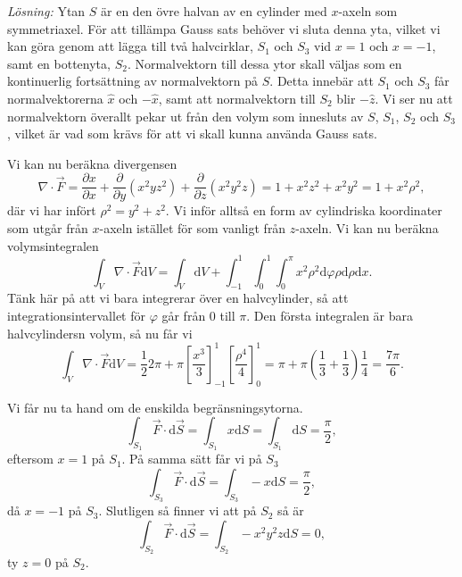 \documentclass[%
oneside,                 %
final,                   %
10pt]{article}
\begin{document}
\emph{Lösning:}  
Ytan $S$ är en den övre halvan av en cylinder med $x$-axeln som symmetriaxel.  För att tillämpa Gauss sats behöver vi sluta denna yta, vilket vi kan göra genom att lägga till  två halvcirklar, $S_1$ och $S_3$ vid $x = 1$ och $x = -1$, samt en bottenyta, $S_2$.  Normalvektorn till dessa ytor skall väljas som en kontinuerlig fortsättning av normalvektorn på $S$.  Detta innebär att $S_1$ och $S_3$ får normalvektorerna $\hat{x}$ och $-\hat{x}$, samt att normalvektorn till $S_2$ blir $-\hat{z}$.  Vi ser nu att  normalvektorn överallt pekar ut från den volym som innesluts av $S$, $S_1$, $S_2$ och $S_3$, vilket är vad som krävs för att vi skall kunna använda Gauss sats.

Vi kan nu beräkna divergensen
\begin{equation}
  \nabla \cdot \vec{F} = \frac{\partial x}{\partial x} + 
\frac{\partial}{\partial y}\left(x^2yz^2\right) + \frac{\partial}{\partial z}
\left(x^2y^2z\right) = 1 + x^2z^2 + x^2 y^2 = 1 + x^2\rho^2,
\end{equation}
där vi har infört $\rho^2 = y^2 + z^2$.  Vi inför alltså en form av cylindriska koordinater som utgår från $x$-axeln istället för som vanligt från $z$-axeln.  Vi kan nu beräkna volymsintegralen
\begin{equation}
  \int_V \nabla \cdot \vec{F} \mbox{d}V = \int_V \mbox{d}V + 
\int_{-1}^1\int_0^1\int_0^\pi x^2 \rho^2 \mbox{d}\varphi \rho \mbox{d}\rho
\mbox{d}x.
\end{equation}
Tänk här på att vi bara integrerar över en halvcylinder, så att integrationsintervallet för $\varphi$ går från 0 till $\pi$.  Den första integralen är bara halvcylindersn volym, så nu får vi
\begin{equation}
  \int_V \nabla \cdot \vec{F} \mbox{d}V = \frac{1}{2} 2 \pi + \pi  \left[\frac{x^3}{3}\right]_{-1}^1 \left[\frac{\rho^4}{4}\right]_0^1 =
\pi + \pi\left(\frac{1}{3} + \frac{1}{3}\right) \frac{1}{4} = \frac{7\pi}{6}.
\end{equation}

Vi får nu ta hand om de enskilda begränsningsytorna.
\begin{equation}
\int_{S_1} \vec{F} \cdot \mbox{d}\vec{S} = \int_{S_1} x\mbox{d}S = 
\int_{S_1} \mbox{d}S =
\frac{\pi}{2},
\end{equation}
eftersom $x = 1$ på $S_1$.  På samma sätt får vi på $S_3$
\begin{equation}
  \int_{S_3} \vec{F} \cdot \mbox{d}\vec{S} = \int_{S_3} -x \mbox{d}S = \frac{\pi}{2},
\end{equation}
då $x = -1$ på $S_3$. Slutligen så finner vi att på $S_2$ så är
\begin{equation}
  \int_{S_2} \vec{F} \cdot \mbox{d}\vec{S} = \int_{S_2} -x^2y^2z \mbox{d}S = 0,
\end{equation}
ty $z = 0$ på $S_2$.
\end{document}
